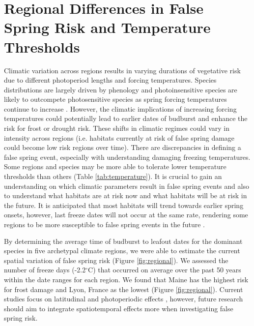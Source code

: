 \documentclass{article}\usepackage[]{graphicx}\usepackage[]{color}
\begin{document}
\section*{Regional Differences in False Spring Risk and Temperature Thresholds}
Climatic variation across regions results in varying durations of vegetative risk due to different photoperiod lengths and forcing temperatures. Species distributions are largely driven by phenology \citep{Chuine2001} and photoinsensitive species are likely to outcompete photosensitive species as spring forcing temperatures continue to increase \cite{Vitasse2011,Gauzere2017}. However, the climatic implications of increasing forcing temperatures could potentially lead to earlier dates of budburst and enhance the risk for frost or drought risk. These shifts in climatic regimes could vary in intensity across regions (i.e. habitats currently at risk of false spring damage could become low risk regions over time). There are discrepancies in defining a false spring event, especially with understanding damaging freezing temperatures. Some regions and species may be more able to tolerate lower temperature thresholds than others (Table \ref{tab:temperature}). It is crucial to gain an understanding on which climatic parameters result in false spring events and also to understand what habitats are at risk now and what habitats will be at risk in the future. It is anticipated that most habitats will trend towards earlier spring onsets, however, last freeze dates will not occur at the same rate, rendering some regions to be more susceptible to false spring events in the future \citep{Labe2016}. 

By determining the average time of budburst to leafout dates for the dominant species in five archetypal climate regions, we were able to estimate the current spatial variation of false spring risk (Figure \ref{fig:regional}). We assessed the number of freeze days (-2.2$^{\circ}$C) \citep{Schwartz1993} that occurred on average over the past 50 years within the date ranges for each region. We found that Maine has the highest risk for frost damage and Lyon, France as the lowest (Figure \ref{fig:regional}). Current studies focus on latitudinal and photoperiodic effects \citep{Partanen2004, Viheraaarnio2006, Caffarra2011, Gauzere2017}, however, future research should aim to integrate spatiotemporal effects more when investigating false spring risk.
\end{document}
